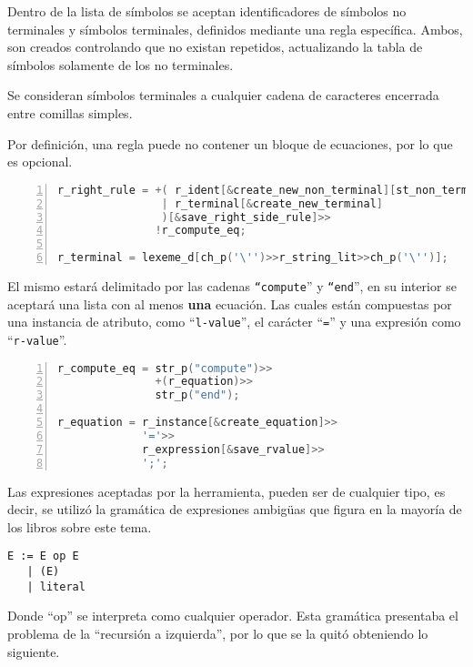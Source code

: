 Dentro de la lista de símbolos se aceptan identificadores de símbolos no terminales y símbolos terminales, definidos mediante una regla específica. Ambos, son creados controlando que no existan repetidos, actualizando la tabla de símbolos solamente de los no terminales.

Se consideran símbolos terminales a cualquier cadena de caracteres encerrada entre comillas simples.

Por definición, una regla puede no contener un bloque de ecuaciones, por lo que es opcional.

\begin{lstlisting}[language=C++, basicstyle=\scriptsize, numbers=left, numbersep=5pt, numberstyle=\tiny]
r_right_rule = +( r_ident[&create_new_non_terminal][st_non_terminal.add]
                | r_terminal[&create_new_terminal]
                )[&save_right_side_rule]>>
               !r_compute_eq;

r_terminal = lexeme_d[ch_p('\'')>>r_string_lit>>ch_p('\'')];
\end{lstlisting}

El mismo estará delimitado por las cadenas \texttt{``compute}'' y \texttt{``end}'', en su interior se aceptará una lista con al menos \textbf{una} ecuación. Las cuales están compuestas por una instancia de atributo, como ``\texttt{l-value}'', el carácter ``\texttt{=}'' y una expresión como ``\texttt{r-value}''.

\begin{lstlisting}[language=C++, basicstyle=\scriptsize, numbers=left, numbersep=5pt, numberstyle=\tiny]
r_compute_eq = str_p("compute")>>
               +(r_equation)>>
               str_p("end");

r_equation = r_instance[&create_equation]>>
             '='>>
             r_expression[&save_rvalue]>>
             ';';
\end{lstlisting}

Las expresiones aceptadas por la herramienta, pueden ser de cualquier tipo, es decir, se utilizó la gramática de expresiones ambigüas que figura en la mayoría de los libros sobre este tema.

\begin{lstlisting}[backgroundcolor=\color{white}]
E := E op E
   | (E)
   | literal
\end{lstlisting}

Donde ``op'' se interpreta como cualquier operador. Esta gramática presentaba el problema de la ``recursión a izquierda'', por lo que se la quitó obteniendo lo siguiente.

